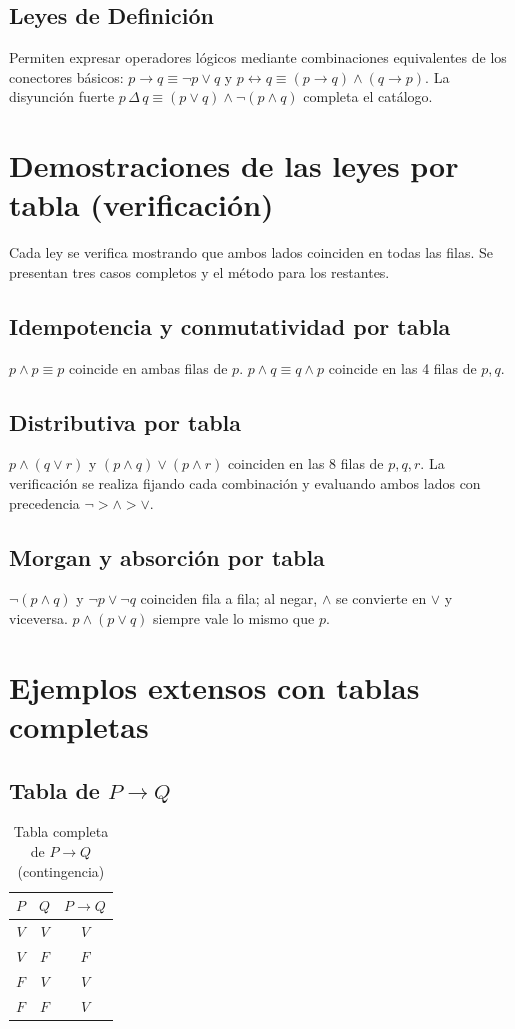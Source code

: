 \documentclass[11pt,a4paper,openany]{book}
\begin{document}
\section{Leyes de Definici\'on}
Permiten expresar operadores l\'ogicos mediante combinaciones equivalentes de los conectores b\'asicos: $p \to q \equiv \lnot p \lor q$ y $p \leftrightarrow q \equiv (p \to q) \land (q \to p)$. La disyunci\'on fuerte $p \,\Delta\, q \equiv (p \lor q) \land \lnot(p \land q)$ completa el cat\'alogo.

\chapter{Demostraciones de las leyes por tabla (verificaci\'on)}
\label{ch:leyes-demo}
Cada ley se verifica mostrando que ambos lados coinciden en todas las filas. Se presentan tres casos completos y el m\'etodo para los restantes.
\section{Idempotencia y conmutatividad por tabla}
$p \land p \equiv p$ coincide en ambas filas de $p$. $p \land q \equiv q \land p$ coincide en las 4 filas de $p,q$.
\section{Distributiva por tabla}
$p \land (q \lor r)$ y $(p \land q) \lor (p \land r)$ coinciden en las 8 filas de $p,q,r$. La verificaci\'on se realiza fijando cada combinaci\'on y evaluando ambos lados con precedencia $\lnot > \land > \lor$.
\section{Morgan y absorci\'on por tabla}
$\lnot(p \land q)$ y $\lnot p \lor \lnot q$ coinciden fila a fila; al negar, $\land$ se convierte en $\lor$ y viceversa. $p \land (p \lor q)$ siempre vale lo mismo que $p$.
\chapter{Ejemplos extensos con tablas completas}
\label{ch:ejemplos-ext}
\section{Tabla de $P \to Q$}
\begin{table}[H]
\centering
\caption{Tabla completa de $P \to Q$ (contingencia)}
\begin{tabular}{cc|c}
\toprule
$P$ & $Q$ & $P \to Q$ \\
\midrule
$V$ & $V$ & $V$ \\
$V$ & $F$ & $F$ \\
$F$ & $V$ & $V$ \\
$F$ & $F$ & $V$ \\
\bottomrule
\end{tabular}
\end{table}
\end{document}
